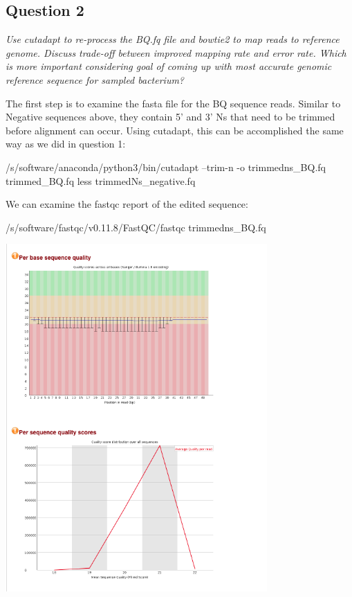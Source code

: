 \documentclass[]{article}
\newenvironment{Shaded}{\begin{snugshade}}{\end{snugshade}}
\newcommand{\FunctionTok}[1]{\textcolor[rgb]{0.00,0.00,0.00}{#1}}
\newcommand{\ExtensionTok}[1]{#1}
\newcommand{\NormalTok}[1]{#1}
\begin{document}
\subsection{Question 2}\label{question-2}

\emph{Use cutadapt to re-process the BQ.fq file and bowtie2 to map reads
to reference genome. Discuss trade-off between improved mapping rate and
error rate. Which is more important considering goal of coming up with
most accurate genomic reference sequence for sampled bacterium?}

The first step is to examine the fasta file for the BQ sequence reads.
Similar to Negative sequences above, they contain 5' and 3' Ns that need
to be trimmed before alignment can occur. Using cutadapt, this can be
accomplished the same way as we did in question 1:

\begin{Shaded}
\begin{Highlighting}[]
\ExtensionTok{/s/software/anaconda/python3/bin/cutadapt}\NormalTok{ --trim-n -o trimmedns_BQ.fq trimmed_BQ.fq}
\FunctionTok{less}\NormalTok{ trimmedNs_negative.fq}
\end{Highlighting}
\end{Shaded}

We can examine the fastqc report of the edited sequence:

\begin{Shaded}
\begin{Highlighting}[]
\ExtensionTok{/s/software/fastqc/v0.11.8/FastQC/fastqc}\NormalTok{ trimmedns_BQ.fq}
\end{Highlighting}
\end{Shaded}

\includegraphics[width=0.75000\textwidth]{trimmedns_BQ_fastqc.png}\\
\end{document}
